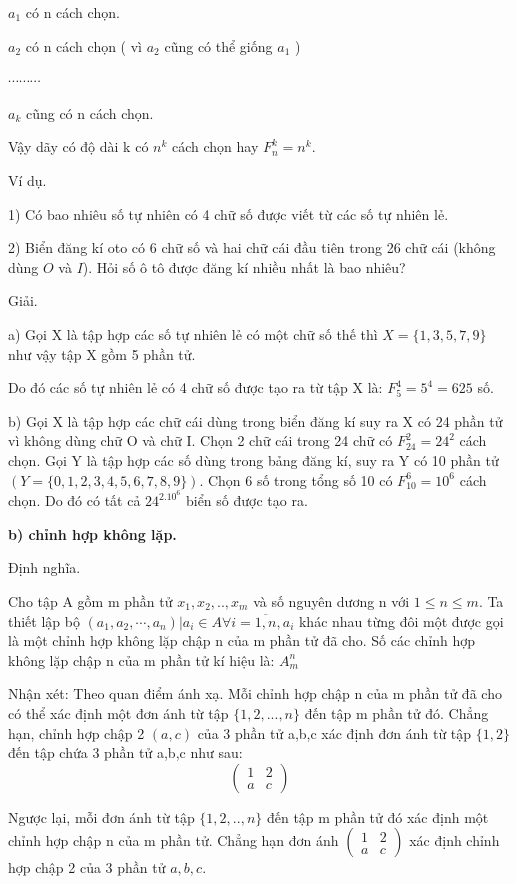 \documentclass[12pt,oneside,a4paper,reqno]{book}
\begin{document}
     $a_1$ có n cách chọn.

     $a_2$ có n cách chọn ( vì  $a_2$ cũng có thể giống $a_1$ )

     $\cdots \cdots \cdots $

     $a_k$ cũng có n cách chọn.
     
Vậy dãy có độ dài k có $n^k$ cách chọn hay $F_n^k=n^k.$

Ví dụ.

1) Có bao nhiêu số tự nhiên có 4 chữ số được viết từ các số tự nhiên lẻ.

2) Biển đăng kí oto có 6 chữ số và hai chữ cái đầu tiên trong 26 chữ cái (không dùng $O$ và $I$). Hỏi số ô tô được đăng kí nhiều nhất là bao nhiêu?

Giải.

a) Gọi X là tập hợp các số tự nhiên lẻ có một chữ số thế thì $X=\{1,3,5,7,9\}$ như vậy tập X gồm 5 phần tử. 

Do đó các số tự nhiên lẻ có 4 chữ số được tạo ra từ tập X là: $F_5^4=5^4=625$ số.

b) Gọi X là tập hợp các chữ cái dùng trong biển đăng kí suy ra X có 24 phần tử vì không dùng chữ O và chữ I. Chọn 2 chữ cái trong 24 chữ có $F_24^2=24^2$ cách chọn. Gọi Y là tập hợp các số dùng trong bảng đăng kí, suy ra Y có 10 phần tử $(Y=\{0,1,2,3,4,5,6,7,8,9\})$. Chọn 6 số trong tổng số 10 có $F_10^6=10^6$ cách chọn. Do đó có tất cả $24^2.10^6$ biển số được tạo ra.

\textbf{b) chỉnh hợp không lặp.}

Định nghĩa.

Cho tập A gồm m phần tử $x_1,x_2,..,x_m$ và số nguyên dương n với $1\le n\le m$. Ta thiết lập bộ $ (a_1,a_2, \cdots ,a_n ) | a_i \in A \forall i=\overline{1,n},a_i$ khác nhau từng đôi một được gọi là  một chỉnh hợp không lặp chập n của m phần tử đã cho. Số các chỉnh hợp không lặp chập n của m phần tử kí hiệu là: $A_m^n$

Nhận xét:
Theo quan điểm ánh xạ. Mỗi chỉnh hợp chập n của m phần tử đã cho có thể xác định một đơn ánh từ tập $\{1,2,...,n\}$ đến tập m phần tử đó. Chẳng hạn, chỉnh hợp chập 2 $(a,c)$ của 3 phần tử a,b,c xác định đơn ánh từ tập $\{1,2\}$  đến tập chứa 3 phần tử a,b,c như sau: $$\begin{pmatrix}
1 &2 \\ 
 a&c 
\end{pmatrix}$$

Ngược lại, mỗi đơn ánh từ tập $\{1,2,..,n\}$ đến tập m phần tử đó xác định một chỉnh hợp chập n của m phần tử. Chẳng hạn đơn ánh  $ \begin{pmatrix}
1 &2 \\ 
 a&c 
\end{pmatrix}$ xác định chỉnh hợp chập 2 của 3 phần tử $a,b,c.$
\end{document}
